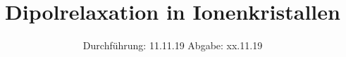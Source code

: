 

\subject{V48}
\title{Dipolrelaxation in Ionenkristallen}
\date{
  Durchführung: 11.11.19
  \hspace{3em}
  Abgabe: xx.11.19
}



\maketitle
\thispagestyle{empty}
\tableofcontents
\newpage




%



\newpage
\printbibliography


